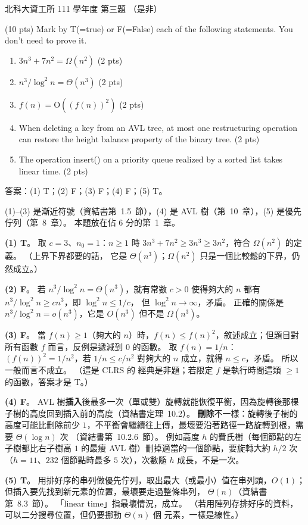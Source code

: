 \begin{pastexam}[label={px:ntut-111-ci-02}]{北科大資工所 111 學年度 第三題}
（是非）

(10 pts) Mark by T(=true) or F(=False) each of the following statements. You don't need to prove it.
\begin{enumerate}[label=(\arabic*)]
\item $3n^3 + 7n^2 = \Omega(n^2)$ (2 pts)
\item $n^3 / \log^2 n = \Theta(n^3)$ (2 pts)
\item $f(n) = \mathrm{O}((f(n))^2)$ (2 pts)
\item When deleting a key from an AVL tree, at most one restructuring operation can restore the height balance property of the binary tree. (2 pts)
\item The operation insert() on a priority queue realized by a sorted list takes linear time. (2 pts)
\end{enumerate}
\end{pastexam}

\begin{pastsoln}
答案：(1) T；(2) F；(3) F；(4) F；(5) T。

(1)--(3) 是漸近符號（資結書第~1.5~節），(4) 是 AVL 樹（第~10~章），(5) 是優先佇列（第~8~章）。 本題放在佔 $6$ 分的第~1~章。

\textbf{(1) T}。 取 $c = 3$、$n_0 = 1$：$n \ge 1$ 時 $3n^3 + 7n^2 \ge 3n^3 \ge 3n^2$，符合 $\Omega(n^2)$ 的定義。 （上界下界都要的話，
它是 $\Theta(n^3)$；$\Omega(n^2)$ 只是一個比較鬆的下界，仍然成立。）

\textbf{(2) F}。 若 $n^3/\log^2 n = \Theta(n^3)$，就有常數 $c > 0$ 使得夠大的 $n$ 都有 $n^3/\log^2 n \ge c n^3$，即 $\log^2 n \le 1/c$，
但 $\log^2 n \to \infty$，矛盾。 正確的關係是 $n^3/\log^2 n = o(n^3)$，它是 $O(n^3)$ 但不是 $\Omega(n^3)$。

\textbf{(3) F}。 當 $f(n) \ge 1$（夠大的 $n$）時，$f(n) \le f(n)^2$，敘述成立；但題目對所有函數 $f$ 而言，反例是遞減到 $0$ 的函數。
取 $f(n) = 1/n$：$(f(n))^2 = 1/n^2$，若 $1/n \le c/n^2$ 對夠大的 $n$ 成立，就得 $n \le c$，矛盾。 所以一般而言不成立。 （這是 CLRS 的
經典是非題；若限定 $f$ 是執行時間這類 $\ge 1$ 的函數，答案才是 T。）

\textbf{(4) F}。 AVL 樹\textbf{插入}後最多一次（單或雙）旋轉就能恢復平衡，因為旋轉後那棵子樹的高度回到插入前的高度（資結書定理~10.2）。
\textbf{刪除}不一樣：旋轉後子樹的高度可能比刪除前少 $1$，不平衡會繼續往上傳，最壞要沿著路徑一路旋轉到根，需要 $\Theta(\log n)$ 次
（資結書第~10.2.6~節）。 例如高度 $h$ 的費氏樹（每個節點的左子樹都比右子樹高 $1$ 的最瘦 AVL 樹）刪掉適當的一個節點，要旋轉大約 $h/2$ 次
（$h = 11$、$232$ 個節點時最多 $5$ 次），次數隨 $h$ 成長，不是一次。

\textbf{(5) T}。 用排好序的串列做優先佇列，取出最大（或最小）值在串列頭，$O(1)$；但插入要先找到新元素的位置，最壞要走過整條串列，
$\Theta(n)$（資結書第~8.3~節）。 「linear time」指最壞情況，成立。 （若用陣列存排好序的資料，可以二分搜尋位置，但仍要挪動 $\Theta(n)$ 個
元素，一樣是線性。）
\end{pastsoln}
